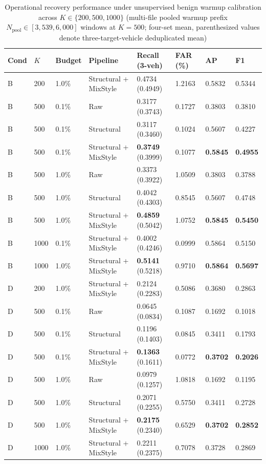\documentclass[12pt, a4paper, reqno, oneside]{book}
\begin{document}
{\renewcommand{\arraystretch}{0.84}
\begin{table}[htbp]\centering\footnotesize\setlength{\tabcolsep}{4pt}
\caption[Operational recovery under benign warmup calibration across K=200, 500, 1000]{Operational recovery performance under unsupervised benign warmup calibration across $K \in \{200, 500, 1000\}$ (multi-file pooled warmup prefix $N_{\text{pool}} \in [3{,}539, 6{,}000]$ windows at $K=500$; four-set mean, parenthesized values denote three-target-vehicle deduplicated mean)}\label{tab:benign-calibration-summary}
\begin{tabular}{P{0.9cm}P{0.9cm}P{1.7cm}P{2.9cm}P{2.2cm}P{1.4cm}P{1.2cm}P{1.2cm}}
\toprule
Cond & $K$ & Budget & Pipeline & Recall (3-veh) & FAR (\%) & AP & F1\\\midrule
B & 200 & 1.0\% & Structural + MixStyle & 0.4734 (0.4949) & 1.2163 & 0.5832 & 0.5344\\
B & 500 & 0.1\% & Raw & 0.3177 (0.3743) & 0.1727 & 0.3803 & 0.3810\\
B & 500 & 0.1\% & Structural & 0.3117 (0.3460) & 0.1024 & 0.5607 & 0.4227\\
B & 500 & 0.1\% & Structural + MixStyle & \textbf{0.3749} (0.3999) & 0.1077 & \textbf{0.5845} & \textbf{0.4955}\\
B & 500 & 1.0\% & Raw & 0.3373 (0.3922) & 1.0509 & 0.3803 & 0.3788\\
B & 500 & 1.0\% & Structural & 0.4042 (0.4303) & 0.8545 & 0.5607 & 0.4748\\
B & 500 & 1.0\% & Structural + MixStyle & \textbf{0.4859} (0.5042) & 1.0752 & \textbf{0.5845} & \textbf{0.5450}\\
B & 1000 & 0.1\% & Structural + MixStyle & 0.4002 (0.4246) & 0.0999 & 0.5864 & 0.5150\\
B & 1000 & 1.0\% & Structural + MixStyle & \textbf{0.5141} (0.5218) & 0.9710 & \textbf{0.5864} & \textbf{0.5697}\\
\midrule
D & 200 & 1.0\% & Structural + MixStyle & 0.2124 (0.2283) & 0.5086 & 0.3680 & 0.2863\\
D & 500 & 0.1\% & Raw & 0.0645 (0.0834) & 0.1087 & 0.1692 & 0.1018\\
D & 500 & 0.1\% & Structural & 0.1196 (0.1403) & 0.0845 & 0.3411 & 0.1793\\
D & 500 & 0.1\% & Structural + MixStyle & \textbf{0.1363} (0.1611) & 0.0772 & \textbf{0.3702} & \textbf{0.2026}\\
D & 500 & 1.0\% & Raw & 0.0979 (0.1257) & 1.0818 & 0.1692 & 0.1195\\
D & 500 & 1.0\% & Structural & 0.2071 (0.2255) & 0.5750 & 0.3411 & 0.2728\\
D & 500 & 1.0\% & Structural + MixStyle & \textbf{0.2175} (0.2340) & 0.6529 & \textbf{0.3702} & \textbf{0.2852}\\
D & 1000 & 1.0\% & Structural + MixStyle & 0.2211 (0.2375) & 0.7078 & 0.3728 & 0.2869\\
\bottomrule\end{tabular}
\end{table}}
\end{document}
